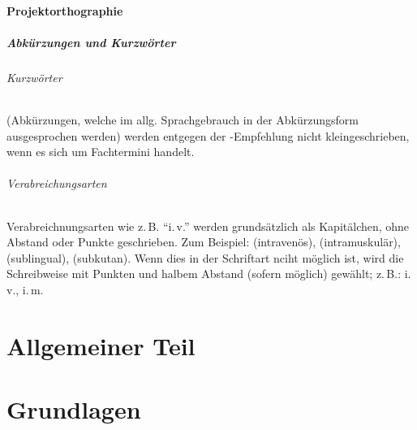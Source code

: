 \documentclass[
ngerman,
paper=a4,
asymmetric,
fontsize=9pt,
headings=small,
draft=false,
parskip=false,
footnotes=multiple,
]{scrbook}
\begin{document}
\subsection*{Projektorthographie}

\subsubsection*{Abkürzungen und Kurzwörter}

\paragraph{Kurzwörter} (Abkürzungen, welche im allg. Sprachgebrauch in der
Abkürzungsform ausgesprochen werden) werden entgegen der -Empfehlung
nicht kleingeschrieben, wenn es sich um Fachtermini handelt. 

\paragraph{Verabreichungsarten}
Verabreichnungsarten wie z.\,B. "`i.\,v."' werden grundsätzlich als 
Kapitälchen, ohne Abstand oder Punkte geschrieben. Zum Beispiel:  (intravenös), 
(intramuskulär),  (sublingual), (subkutan). Wenn dies in der
Schriftart nciht möglich ist, wird die Schreibweise mit Punkten und halbem
Abstand (sofern möglich) gewählt; z.\,B.: {\ttfamily i.\,v., i.\,m.}

\part{Allgemeiner Teil}

 





% 
% 
% 






\setcounter{chapter}{10}
\setcounter{page}{0}

\part{Grundlagen}




\end{document}
